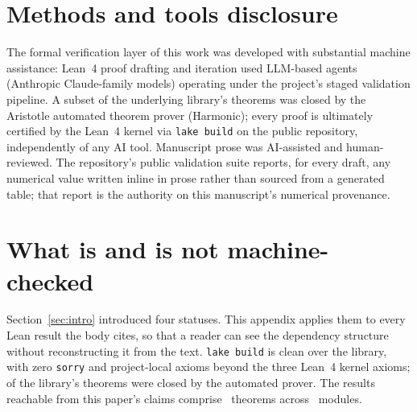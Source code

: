 \documentclass[aps,prd,reprint,nofootinbib,superscriptaddress]{revtex4-2}
\begin{document}
\section*{Methods and tools disclosure}
The formal verification layer of this work was developed with substantial
machine assistance: Lean~4 proof drafting and iteration used LLM-based
agents (Anthropic Claude-family models) operating under the project's
staged validation pipeline. A subset of the underlying library's theorems
was closed by the Aristotle automated theorem prover (Harmonic); every
proof is ultimately certified by the Lean~4 kernel via \texttt{lake build}
on the public repository, independently of any AI tool. Manuscript prose
was AI-assisted and human-reviewed. The repository's public validation
suite reports, for every draft, any numerical value written inline in
prose rather than sourced from a generated table; that report is the
authority on this manuscript's numerical provenance.

\appendix

\section{What is and is not machine-checked}
\label{app:status}

Section~\ref{sec:intro} introduced four statuses. This appendix applies
them to every Lean result the body cites, so that a reader can see the
dependency structure without reconstructing it from the text.
\texttt{lake build} is clean over the library, with zero \texttt{sorry}
and \axiomcount{} project-local axioms beyond the three Lean~4 kernel
axioms; \aristotleproved{} of the library's theorems were closed by the
automated prover. The results reachable from this paper's claims comprise
\bundleTheorems{}~theorems across \bundleModules{}~modules.

\begin{table}[t]
\centering
\caption{Status of the Lean results cited in the body.
\emph{Derived}: the conclusion constrains something the hypotheses do not
already assert. \emph{Conditional}: the physical content is a hypothesis
and the theorem propagates it. \emph{Definitional}: the statement unfolds
a definition or rearranges a structure field. \emph{Demarcation}: a
kernel-checked statement that a model does not apply.}
\label{tab:status}
\begin{ruledtabular}

\end{ruledtabular}
\end{table}
\end{document}
